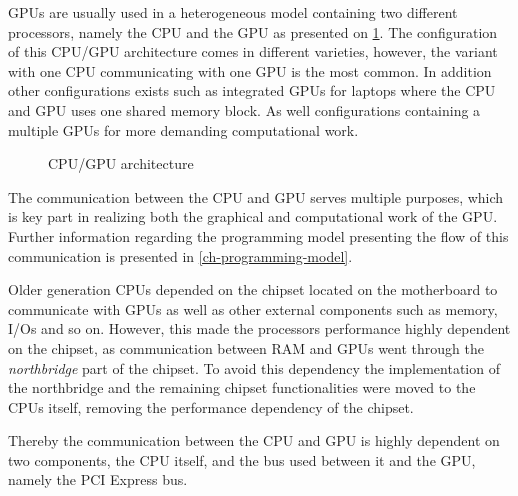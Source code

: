 GPUs are usually used in a heterogeneous model containing two different processors, namely the CPU and the GPU as presented on \cref{fig:hw-cpu-gpu}.
The configuration of this CPU/GPU architecture comes in different varieties, however, the variant with one CPU communicating with one GPU is the most common.
In addition other configurations exists such as integrated GPUs for laptops where the CPU and GPU uses one shared memory block.
As well configurations containing a multiple GPUs for more demanding computational work.

\begin{figure}[ht]
	\centering
	\caption{CPU/GPU architecture}
	\label{fig:hw-cpu-gpu}
\end{figure}

The communication between the CPU and GPU serves multiple purposes, which is key part in realizing both the graphical and computational work of the GPU.
Further information regarding the programming model presenting the flow of this communication is presented in \cref{ch-programming-model}.

Older generation CPUs depended on the chipset located on the motherboard to communicate with GPUs as well as other external components such as memory, I/Os and so on.
However, this made the processors performance highly dependent on the chipset, as communication between RAM and GPUs went through the \textit{northbridge} part of the chipset.
To avoid this dependency the implementation of the northbridge and the remaining chipset functionalities were moved to the CPUs itself, removing the performance dependency of the chipset.

Thereby the communication between the CPU and GPU is highly dependent on two components, the CPU itself, and the bus used between it and the GPU, namely the PCI Express bus.